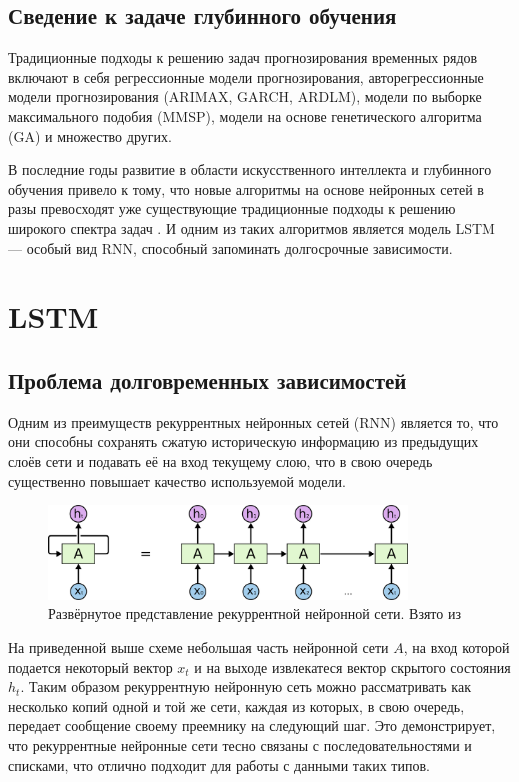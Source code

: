 \documentclass[14pt]{extarticle}
\begin{document}
\subsection{Сведение к задаче глубинного обучения} 

Традиционные подходы к решению задач прогнозирования временных рядов включают в себя регрессионные модели прогнозирования, авторегрессионные модели прогнозирования (ARIMAX, GARCH, ARDLM), модели по выборке максимального подобия (MMSP), модели на основе генетического алгоритма (GA) и множество других.

В последние годы развитие в области искусственного интеллекта и глубинного обучения привело к тому, что новые алгоритмы на основе нейронных сетей в разы превосходят уже существующие традиционные подходы к решению широкого спектра задач \cite{Sholtanyuk}. И одним из таких алгоритмов является модель LSTM --- особый вид RNN, способный запоминать долгосрочные зависимости. 

\section{LSTM}

\subsection{Проблема долговременных зависимостей}

Одним из преимуществ рекуррентных нейронных сетей (RNN) является то, что они способны сохранять сжатую историческую информацию из предыдущих слоёв сети и подавать её на вход текущему слою, что в свою очередь существенно повышает качество используемой модели.

\begin{figure}[h]
	\centering
	\includegraphics[width=0.85\textwidth]{img/RNN-unrolled.png}
	\caption{Развёрнутое представление рекуррентной нейронной сети. Взято из \cite{Colah}}
	\label{fig:rnn}
\end{figure}

На приведенной выше схеме небольшая часть нейронной сети $A$, на вход которой подается некоторый вектор $x_t$ и на выходе извлекатеся вектор скрытого состояния $h_t$. Таким образом рекуррентную нейронную сеть можно рассматривать как несколько копий одной и той же сети, каждая из которых, в свою очередь, передает сообщение своему преемнику на следующий шаг. Это демонстрирует, что рекуррентные нейронные сети тесно связаны с последовательностями и списками, что отлично подходит для работы с данными таких типов. 
\end{document}
